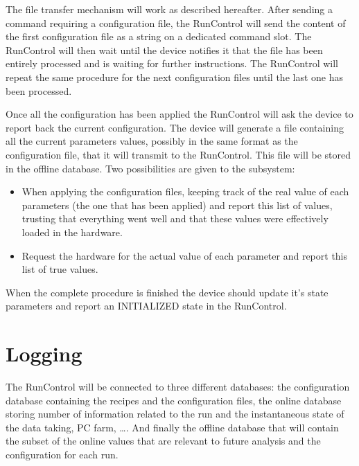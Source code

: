 \documentclass[a4paper]{article}
\begin{document}
The file transfer mechanism will work as described hereafter. After sending a command requiring a
configuration file, the RunControl will send the content of the first configuration file as a
string on a dedicated command slot. The RunControl will then wait until the device notifies it that
the file has been entirely processed and is waiting for further instructions. The RunControl will
repeat the same procedure for the next configuration files until the last one has been processed.

Once all the configuration has been applied the RunControl will ask the device to report back the
current configuration. The device will generate a file containing all the current parameters values,
possibly in the same format as the configuration file, that it will transmit to the RunControl. This
file will be stored in the offline database. Two possibilities are given to the subsystem:
\begin{itemize}
  \item When applying the configuration files, keeping track of the real value of each parameters
  (the one that has been applied) and report this list of values, trusting that everything went well
  and that these values were effectively loaded in the hardware.
  \item Request the hardware for the actual value of each parameter and report this list of true
  values.
\end{itemize}

When the complete procedure is finished the device should update it's state parameters and report an
INITIALIZED state in the RunControl. 

\section{Logging}
The RunControl will be connected to three different databases: the configuration database containing
the recipes and the configuration files, the online database storing number of information related
to the run and the instantaneous state of the data taking, PC farm, \ldots. And finally the offline
database that will contain the subset of the online values that are relevant to future analysis and
the configuration for each run.
\end{document}
